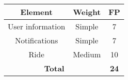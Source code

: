 \begin{center}
\begin{tabular}{|c|c|c|}
\hline
\multicolumn{1}{|c|}{\textbf{Element}} & \multicolumn{1}{c|}{\textbf{Weight}} & \multicolumn{1}{c|}{\textbf{FP}}\\
\hline
User information	&Simple	&7\\
Notifications		&Simple &7\\
Ride				&Medium	&10\\
\hline
\multicolumn{2}{|c|}{\textbf{Total}} & \multicolumn{1}{c|}{\textbf{24}}\\
\hline
\end{tabular}
\end{center}
